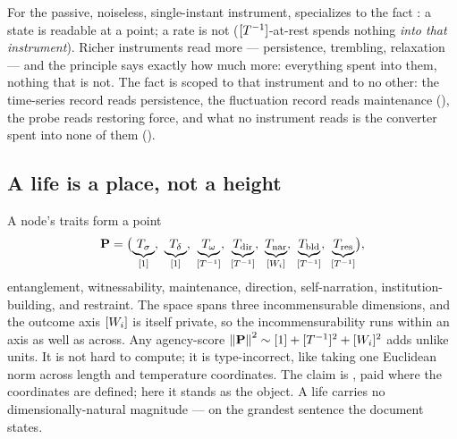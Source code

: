\documentclass[../main]{subfiles}
\begin{document}
\begin{corollary}
  For the passive, noiseless, single-instant instrument,  specializes to
  the fact : a state is readable at a point; a rate is not
  ($[T\sp{-1}]$-at-rest spends nothing \emph{into that instrument}). Richer instruments
  read more --- persistence, trembling, relaxation --- and the principle says exactly how
  much more: everything spent into them, nothing that is not. The fact is scoped to
  that instrument and to no other: the time-series record reads persistence, the
  fluctuation record reads maintenance (), the probe reads restoring
  force, and what no instrument reads is the converter spent into none of them
  ().
\end{corollary}


\subsection{A life is a place, not a height}
\label{subsec:gen:place}
%
%
%
A node's traits form a point
\begin{equation}
  \profile=\bigl(\underbrace{\traitsigma}_{\dimratio},\ \underbrace{\traitdensity}_{\dimratio},\
  \underbrace{\traitwill}_{\dimrate},\ \underbrace{\traitdirection}_{\dimrate},\
  \underbrace{\traitnarration}_{\dimnodewelfare{i}},\ \underbrace{\traitbuilding}_{\dimrate},\
  \underbrace{\traitrestraint}_{\dimrate}\bigr),
  \label{P:vec}
\end{equation}
entanglement, witnessability, maintenance, direction, self-narration, institution-building,
and restraint. The space spans three incommensurable dimensions, and the outcome axis
$[W\sb{i}]$ is itself private, so the incommensurability runs within an axis as
well as across. Any agency-score
$\left\lVert \mathbf{P} \right\rVert^2\sim[1]+[T\sp{-1}]\sp{2}+[W\sb{i}]\sp{2}$ adds unlike units.
It is not hard to compute; it is type-incorrect, like taking one Euclidean norm across
length and temperature coordinates. The claim is , paid where the coordinates are defined; here it stands
as the object. A life carries no dimensionally-natural magnitude --- \ftag{g:knock} on the
grandest sentence the document states.
\end{document}
